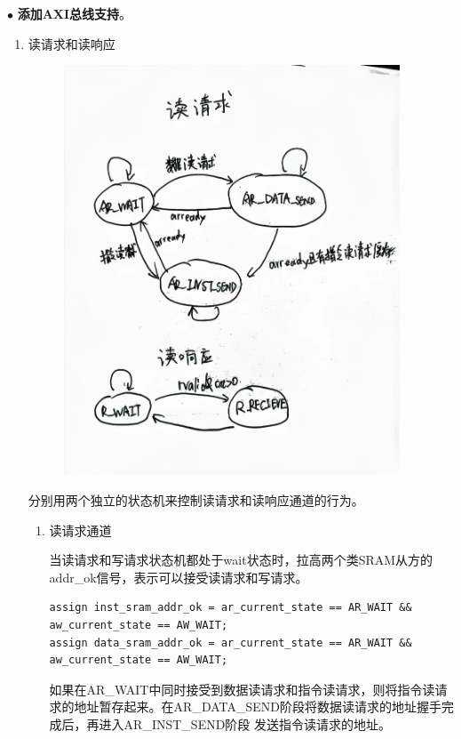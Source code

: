 \documentclass[11pt]{article}
\begin{document}
\noindent
$\bullet$
\textbf{添加AXI总线支持}。
\vspace{1ex}
\begin{enumerate}
  \item 读请求和读响应
  
  \begin{figure}[H]
    \centering
    \includegraphics[width=10cm]{fig/fig4.jpg}
  \end{figure}
  分别用两个独立的状态机来控制读请求和读响应通道的行为。
  \begin{enumerate}
    \item 读请求通道
    
    当读请求和写请求状态机都处于wait状态时，拉高两个类SRAM从方的addr\_ok信号，表示可以接受读请求和写请求。

    \begin{lstlisting}
assign inst_sram_addr_ok = ar_current_state == AR_WAIT && aw_current_state == AW_WAIT;
assign data_sram_addr_ok = ar_current_state == AR_WAIT && aw_current_state == AW_WAIT;
    \end{lstlisting}


    如果在AR_WAIT中同时接受到数据读请求和指令读请求，则将指令读请求的地址暂存起来。在AR\_DATA\_SEND阶段将数据读请求的地址握手完成后，再进入AR\_INST\_SEND阶段
    发送指令读请求的地址。


\end{enumerate}
\end{enumerate}
\end{document}
